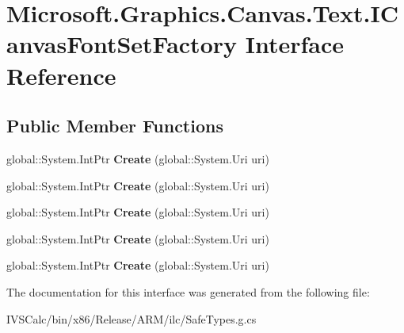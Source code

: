 \hypertarget{interface_microsoft_1_1_graphics_1_1_canvas_1_1_text_1_1_i_canvas_font_set_factory}{}\section{Microsoft.\+Graphics.\+Canvas.\+Text.\+I\+Canvas\+Font\+Set\+Factory Interface Reference}
\label{interface_microsoft_1_1_graphics_1_1_canvas_1_1_text_1_1_i_canvas_font_set_factory}
\subsection*{Public Member Functions}
\begin{DoxyCompactItemize}
\item 
\mbox{\label{interface_microsoft_1_1_graphics_1_1_canvas_1_1_text_1_1_i_canvas_font_set_factory_aca731c1c2ffae33058c6a9ad790f1dad}} 
global\+::\+System.\+Int\+Ptr {\bfseries Create} (global\+::\+System.\+Uri uri)
\item 
\mbox{\label{interface_microsoft_1_1_graphics_1_1_canvas_1_1_text_1_1_i_canvas_font_set_factory_aca731c1c2ffae33058c6a9ad790f1dad}} 
global\+::\+System.\+Int\+Ptr {\bfseries Create} (global\+::\+System.\+Uri uri)
\item 
\mbox{\label{interface_microsoft_1_1_graphics_1_1_canvas_1_1_text_1_1_i_canvas_font_set_factory_aca731c1c2ffae33058c6a9ad790f1dad}} 
global\+::\+System.\+Int\+Ptr {\bfseries Create} (global\+::\+System.\+Uri uri)
\item 
\mbox{\label{interface_microsoft_1_1_graphics_1_1_canvas_1_1_text_1_1_i_canvas_font_set_factory_aca731c1c2ffae33058c6a9ad790f1dad}} 
global\+::\+System.\+Int\+Ptr {\bfseries Create} (global\+::\+System.\+Uri uri)
\item 
\mbox{\label{interface_microsoft_1_1_graphics_1_1_canvas_1_1_text_1_1_i_canvas_font_set_factory_aca731c1c2ffae33058c6a9ad790f1dad}} 
global\+::\+System.\+Int\+Ptr {\bfseries Create} (global\+::\+System.\+Uri uri)
\end{DoxyCompactItemize}


The documentation for this interface was generated from the following file\+:\begin{DoxyCompactItemize}
\item 
I\+V\+S\+Calc/bin/x86/\+Release/\+A\+R\+M/ilc/Safe\+Types.\+g.\+cs\end{DoxyCompactItemize}
